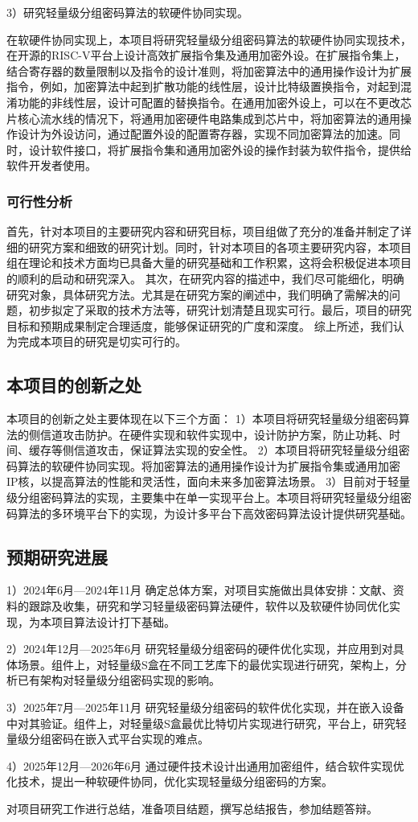\documentclass{ctexart}
\begin{document}
3）研究轻量级分组密码算法的软硬件协同实现。

在软硬件协同实现上，本项目将研究轻量级分组密码算法的软硬件协同实现技术，在开源的RISC-V平台上设计高效扩展指令集及通用加密外设。在扩展指令集上，结合寄存器的数量限制以及指令的设计准则，将加密算法中的通用操作设计为扩展指令，例如，加密算法中起到扩散功能的线性层，设计比特级置换指令，对起到混淆功能的非线性层，设计可配置的替换指令。在通用加密外设上，可以在不更改芯片核心流水线的情况下，将通用加密硬件电路集成到芯片中，将加密算法的通用操作设计为外设访问，通过配置外设的配置寄存器，实现不同加密算法的加速。同时，设计软件接口，将扩展指令集和通用加密外设的操作封装为软件指令，提供给软件开发者使用。


\subsubsection{可行性分析}

首先，针对本项目的主要研究内容和研究目标，项目组做了充分的准备并制定了详细的研究方案和细致的研究计划。同时，针对本项目的各项主要研究内容，本项目组在理论和技术方面均已具备大量的研究基础和工作积累，这将会积极促进本项目的顺利的启动和研究深入。
其次，在研究内容的描述中，我们尽可能细化，明确研究对象，具体研究方法。尤其是在研究方案的阐述中，我们明确了需解决的问题，初步拟定了采取的技术方法等，研究计划清楚且现实可行。最后，项目的研究目标和预期成果制定合理适度，能够保证研究的广度和深度。
综上所述，我们认为完成本项目的研究是切实可行的。


\subsection{本项目的创新之处}

本项目的创新之处主要体现在以下三个方面：
1）本项目将研究轻量级分组密码算法的侧信道攻击防护。在硬件实现和软件实现中，设计防护方案，防止功耗、时间、缓存等侧信道攻击，保证算法实现的安全性。
2）本项目将研究轻量级分组密码算法的软硬件协同实现。将加密算法的通用操作设计为扩展指令集或通用加密IP核，以提高算法的性能和灵活性，面向未来多加密算法场景。
3）目前对于轻量级分组密码算法的实现，主要集中在单一实现平台上。本项目将研究轻量级分组密码算法的多环境平台下的实现，为设计多平台下高效密码算法设计提供研究基础。

\subsection{预期研究进展}
1）2024年6月—2024年11月
确定总体方案，对项目实施做出具体安排：文献、资料的跟踪及收集，研究和学习轻量级密码算法硬件，软件以及软硬件协同优化实现，为本项目算法设计打下基础。

2）2024年12月—2025年6月
研究轻量级分组密码的硬件优化实现，并应用到对具体场景。组件上，对轻量级S盒在不同工艺库下的最优实现进行研究，架构上，分析已有架构对轻量级分组密码实现的影响。

3）2025年7月—2025年11月
研究轻量级分组密码的软件优化实现，并在嵌入设备中对其验证。组件上，对轻量级S盒最优比特切片实现进行研究，平台上，研究轻量级分组密码在嵌入式平台实现的难点。

4）2025年12月—2026年6月
通过硬件技术设计出通用加密组件，结合软件实现优化技术，提出一种软硬件协同，优化实现轻量级分组密码的方案。

对项目研究工作进行总结，准备项目结题，撰写总结报告，参加结题答辩。
\end{document}
